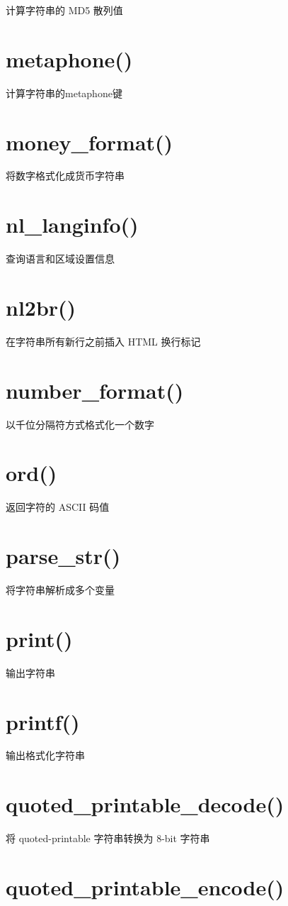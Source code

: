 计算字符串的 MD5 散列值
\section{metaphone()}

计算字符串的metaphone键
\section{money\_format()}
将数字格式化成货币字符串

\section{nl\_langinfo()}

查询语言和区域设置信息
\section{nl2br()}

在字符串所有新行之前插入 HTML 换行标记
\section{number\_format()}

以千位分隔符方式格式化一个数字
\section{ord()}

返回字符的 ASCII 码值
\section{parse\_str()}

将字符串解析成多个变量
\section{print()}

输出字符串
\section{printf()}

输出格式化字符串
\section{quoted\_printable\_decode()}

将 quoted-printable 字符串转换为 8-bit 字符串
\section{quoted\_printable\_encode()}

